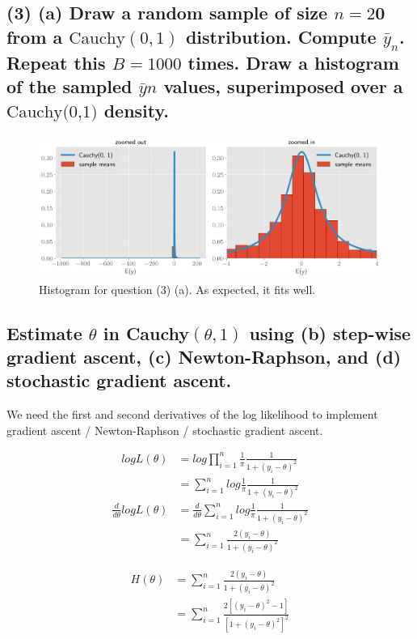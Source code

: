 \documentclass[11pt]{article}
\begin{document}
\subsection*{(3)  (a) Draw a random sample of size $n = 2$0 from a $\text{Cauchy}(0,1)$ distribution. Compute $\bar{y}_n$. Repeat this $B = 1000$ times. Draw a histogram of the sampled $\bar{y}n$ values, superimposed over a $\text{Cauchy(0,1)}$ density.}

\begin{figure}[!h]
    \centering
    \includegraphics[scale=.55]{homework_2/figures/cauchy_mean.png}
    \caption{Histogram for question (3) (a). As expected, it fits well.}
    \label{fig:my_label}
\end{figure}

\subsection*{Estimate $\theta$ in Cauchy$(\theta, 1)$ using (b) step-wise gradient ascent, (c) Newton-Raphson, and (d) stochastic gradient ascent. }

We need the first and second derivatives of the log likelihood to implement gradient ascent / Newton-Raphson / stochastic gradient ascent. 

\begin{align*} log L(\theta) &= log \prod_{i=1}^n \frac{1}{\pi}\frac{1}{1+(y_i-\theta)^2} \\
&= \sum_{i=1}^n log \frac{1}{\pi}\frac{1}{1+(y_i-\theta)^2} \end{align*}
\begin{align*} \frac{d}{d\theta}log L(\theta) &= \frac{d}{d\theta}\sum_{i=1}^n log \frac{1}{\pi}\frac{1}{1+(y_i-\theta)^2} \\
&=  \sum_{i=1}^n   \frac{2(y_i-\theta)}{1+(y_i-\theta)^2}\end{align*}

\begin{align*} H(\theta) &=\sum_{i=1}^n   \frac{2(y_i-\theta)}{1+(y_i-\theta)^2} \\
&=  \sum_{i=1}^n   \frac{2[(y_i-\theta)^2-1]}{[1+(y_i-\theta)^2]^2} \end{align*}
\end{document}
